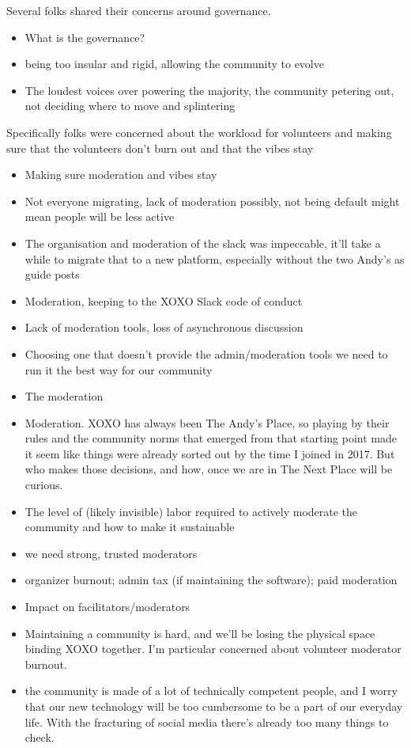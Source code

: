 \documentclass[
]{book}
\providecommand{\tightlist}{%
  \setlength{\itemsep}{0pt}\setlength{\parskip}{0pt}}
\begin{document}
Several folks shared their concerns around governance.

\begin{itemize}
\tightlist
\item
  What is the governance?
\item
  being too insular and rigid, allowing the community to evolve
\item
  The loudest voices over powering the majority, the community petering out, not deciding where to move and splintering
\end{itemize}

Specifically folks were concerned about the workload for volunteers and making sure that the volunteers don't burn out and that the vibes stay

\begin{itemize}
\tightlist
\item
  Making sure moderation and vibes stay
\item
  Not everyone migrating, lack of moderation possibly, not being default might mean people will be less active
\item
  The organisation and moderation of the slack was impeccable, it'll take a while to migrate that to a new platform, especially without the two Andy's as guide posts
\item
  Moderation, keeping to the XOXO Slack code of conduct
\item
  Lack of moderation tools, loss of asynchronous discussion
\item
  Choosing one that doesn't provide the admin/moderation tools we need to run it the best way for our community
\item
  The moderation
\item
  Moderation. XOXO has always been The Andy's Place, so playing by their rules and the community norms that emerged from that starting point made it seem like things were already sorted out by the time I joined in 2017. But who makes those decisions, and how, once we are in The Next Place will be curious.
\item
  The level of (likely invisible) labor required to actively moderate the community and how to make it sustainable
\item
  we need strong, trusted moderators
\item
  organizer burnout; admin tax (if maintaining the software); paid moderation
\item
  Impact on facilitators/moderators
\item
  Maintaining a community is hard, and we'll be losing the physical space binding XOXO together. I'm particular concerned about volunteer moderator burnout.
\item
  the community is made of a lot of technically competent people, and I worry that our new technology will be too cumbersome to be a part of our everyday life. With the fracturing of social media there's already too many things to check.
\end{itemize}
\end{document}
